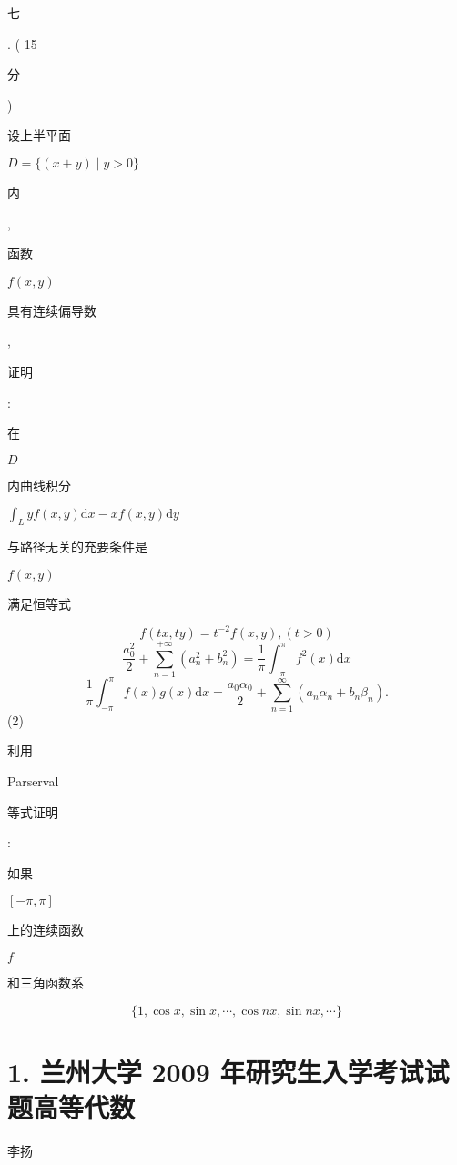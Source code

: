 \documentclass[10pt]{article}
\begin{document}
\begin{CJK}{UTF8}{mj}七\end{CJK}. ( 15 \begin{CJK}{UTF8}{mj}分\end{CJK}) \begin{CJK}{UTF8}{mj}设上半平面\end{CJK} $D=\{(x+y) \mid y>0\}$ \begin{CJK}{UTF8}{mj}内\end{CJK}, \begin{CJK}{UTF8}{mj}函数\end{CJK} $f(x, y)$ \begin{CJK}{UTF8}{mj}具有连续偏导数\end{CJK}, \begin{CJK}{UTF8}{mj}证明\end{CJK}: \begin{CJK}{UTF8}{mj}在\end{CJK} $D$ \begin{CJK}{UTF8}{mj}内曲线积分\end{CJK} $\int_{L} y f(x, y) \mathrm{d} x-x f(x, y) \mathrm{d} y$ \begin{CJK}{UTF8}{mj}与路径无关的充要条件是\end{CJK} $f(x, y)$ \begin{CJK}{UTF8}{mj}满足恒等式\end{CJK}
$$
f(t x, t y)=t^{-2} f(x, y),(t>0)
$$
$$
\frac{a_{0}^{2}}{2}+\sum_{n=1}^{+\infty}\left(a_{n}^{2}+b_{n}^{2}\right)=\frac{1}{\pi} \int_{-\pi}^{\pi} f^{2}(x) \mathrm{d} x
$$
$$
\frac{1}{\pi} \int_{-\pi}^{\pi} f(x) g(x) \mathrm{d} x=\frac{a_{0} \alpha_{0}}{2}+\sum_{n=1}^{\infty}\left(a_{n} \alpha_{n}+b_{n} \beta_{n}\right) .
$$
(2) \begin{CJK}{UTF8}{mj}利用\end{CJK} Parserval \begin{CJK}{UTF8}{mj}等式证明\end{CJK}: \begin{CJK}{UTF8}{mj}如果\end{CJK} $[-\pi, \pi]$ \begin{CJK}{UTF8}{mj}上的连续函数\end{CJK} $f$ \begin{CJK}{UTF8}{mj}和三角函数系\end{CJK}
$$
\{1, \cos x, \sin x, \cdots, \cos n x, \sin n x, \cdots\}
$$

\section{1. 兰州大学 2009 年研究生入学考试试题高等代数}
\begin{CJK}{UTF8}{mj}李扬\end{CJK}
\end{document}
